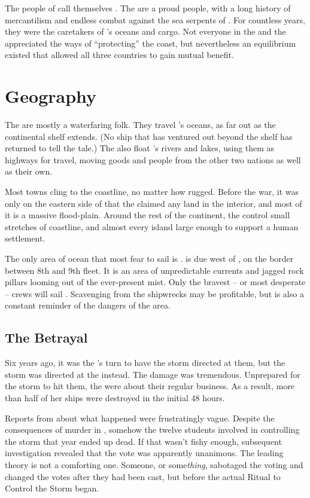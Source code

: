 \documentclass[blue]{GL2020}
\begin{document}
\name{\bVikings{}}

The people of \pShip{} call themselves \pShippies{}. The \pShippies{} are a proud people, with a long history of mercantilism and endless combat against the sea serpents of \pEarth{}. For countless years, they were the caretakers of \pEarth{}'s oceans and cargo. Not everyone in the \pFarm{} and the \pTech{} appreciated the \pShip{} ways of ``protecting'' the coast, but nevertheless an equilibrium existed that allowed all three countries to gain mutual benefit.

\section*{Geography}
The \pShip{} are mostly a waterfaring folk. They travel \pEarth{}'s oceans, as far out as the continental shelf extends. (No ship that has ventured out beyond the shelf has returned to tell the tale.) The \pShippies{} also float \pEarth{}'s rivers and lakes, using them as highways for travel, moving goods and people from the other two nations as well as their own.

Most \pShip{} towns cling to the coastline, no matter how rugged. Before the war, it was only on the eastern side of \pEarth{} that the \pShippies{} claimed any land in the interior, and most of it is a massive flood-plain. Around the rest of the continent, the \pShip{} control small stretches of coastline, and almost every island large enough to support a human settlement. 

The only area of ocean that most \pShippies{} fear to sail is \pWod{}. \pWod{} is due west of \pEarth{}, on the border between 8th and 9th fleet. It is an area of unpredictable currents and jagged rock pillars looming out of the ever-present mist. Only the bravest -- or most desperate -- crews will sail \pWod{}. Scavenging from the shipwrecks may be profitable, but is also a constant reminder of the dangers of the area.

\subsection*{The Betrayal}
Six years ago, it was the \pTech{}'s turn to have the storm directed at them, but the storm was directed at the \pShip{} instead. The damage was tremendous. Unprepared for the storm to hit them, the \pShippies{} were about their regular business. As a result, more than half of her ships were destroyed in the initial 48 hours. 

Reports from \pSchool{} about what happened were frustratingly vague. Despite the consequences of murder in \pEarth{}, somehow the twelve students involved in controlling the storm that year ended up dead. If that wasn't fishy enough, subsequent investigation revealed that the vote was apparently unanimous. The leading theory is not a comforting one. Someone, or some\emph{thing}, sabotaged the voting and changed the votes after they had been cast, but before the actual Ritual to Control the Storm began.
\end{document}
